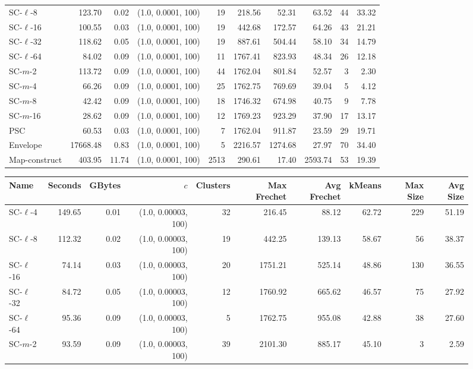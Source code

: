 \begin{figure}
\begin{center}
\begin{minipage}{\textwidth}
{\begin{tabular}{@{}lrrrrrrrrr@{}}
SC-$\ell$-8 & 123.70 & 0.02 & (1.0, 0.0001, 100) & 19 & 218.56 & 52.31 & 63.52 & 44 & 33.32\\
SC-$\ell$-16 & 100.55 & 0.03 & (1.0, 0.0001, 100) & 19 & 442.68 & 172.57 & 64.26 & 43 & 21.21\\
SC-$\ell$-32 & 118.62 & 0.05 & (1.0, 0.0001, 100) & 19 & 887.61 & 504.44 & 58.10 & 34 & 14.79\\
SC-$\ell$-64 & 84.02 & 0.09 & (1.0, 0.0001, 100) & 11 & 1767.41 & 823.93 & 48.34 & 26 & 12.18\\
SC-$m$-2 & 113.72 & 0.09 & (1.0, 0.0001, 100) & 44 & 1762.04 & 801.84 & 52.57 & 3 & 2.30\\
SC-$m$-4 & 66.26 & 0.09 & (1.0, 0.0001, 100) & 25 & 1762.75 & 769.69 & 39.04 & 5 & 4.12\\
SC-$m$-8 & 42.42 & 0.09 & (1.0, 0.0001, 100) & 18 & 1746.32 & 674.98 & 40.75 & 9 & 7.78\\
SC-$m$-16 & 28.62 & 0.09 & (1.0, 0.0001, 100) & 12 & 1769.23 & 923.29 & 37.90 & 17 & 13.17\\
PSC& 60.53 & 0.03 & (1.0, 0.0001, 100) & 7 & 1762.04 & 911.87 & 23.59 & 29 & 19.71\\
Envelope & 17668.48 & 0.83 & (1.0, 0.0001, 100) & 5 & 2216.57 & 1274.68 & 27.97 & 70 & 34.40\\
Map-construct & 403.95 & 11.74 & (1.0, 0.0001, 100) & 2513 & 290.61 & 17.40 & 2593.74 & 53 & 19.39\\
        \bottomrule
    \end{tabular}
    }
    {
    \begin{tabular}{@{}lrrrrrrrrr@{}}
        \toprule
        Name & Seconds & GBytes & $c$ & Clusters & Max Frechet & Avg Frechet & kMeans & Max Size & Avg Size\\
        \midrule
        SC-$\ell$-4 & 149.65 & 0.01 & (1.0, 0.00003, 100) & 32 & 216.45 & 88.12 & 62.72 & 229 & 51.19\\
SC-$\ell$-8 & 112.32 & 0.02 & (1.0, 0.00003, 100) & 19 & 442.25 & 139.13 & 58.67 & 56 & 38.37\\
SC-$\ell$-16 & 74.14 & 0.03 & (1.0, 0.00003, 100) & 20 & 1751.21 & 525.14 & 48.86 & 130 & 36.55\\
SC-$\ell$-32 & 84.72 & 0.05 & (1.0, 0.00003, 100) & 12 & 1760.92 & 665.62 & 46.57 & 75 & 27.92\\
SC-$\ell$-64 & 95.36 & 0.09 & (1.0, 0.00003, 100) & 5 & 1762.75 & 955.08 & 42.88 & 38 & 27.60\\
SC-$m$-2 & 93.59 & 0.09 & (1.0, 0.00003, 100) & 39 & 2101.30 & 885.17 & 45.10 & 3 & 2.59\\

\end{tabular}}
\end{minipage}
\end{center}
\end{figure}
